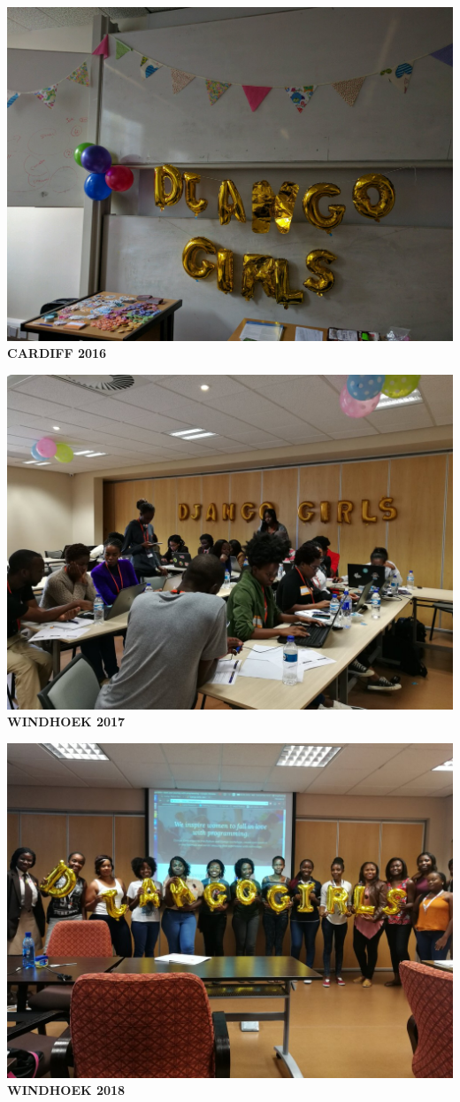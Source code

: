 \documentclass{beamer}
\begin{document}
\begin{frame}
    \begin{center}
    \includegraphics[width=.7\textwidth]{static/first_django_girls.jpeg} \\
    \textbf{CARDIFF 2016}
    \end{center}
\end{frame}

\begin{frame}
    \centering
    \includegraphics[width=.7\textwidth]{static/windhoek_2017} \\
    \textbf{WINDHOEK 2017}
\end{frame}

\begin{frame}
    \centering
    \includegraphics[width=.7\textwidth]{static/windhoek_2018} \\
    \textbf{WINDHOEK 2018}
\end{frame}
\end{document}
